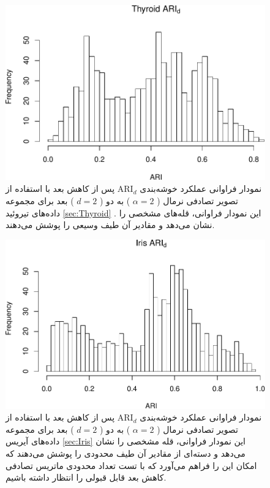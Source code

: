 \begin{figure}[H]
\centering
\includegraphics[width=0.7\linewidth]{Report_files/figure-latex/unnamed-chunk-3-1} 
\caption{
نمودار فراوانی عملکرد خوشه‌بندی 
$\mathrm{ARI}_d$
پس از کاهش بعد با استفاده از تصویر تصادفی
نرمال (%
$\alpha=2$%
)
به دو (%
$d=2$%
)
بعد برای مجموعه داده‌های
تیروئید
\ref{sec:Thyroid}
. این نمودار فراوانی،
قله‌های
مشخصی را نشان 
می‌دهد
و مقادیر آن طیف 
وسیعی را پوشش می‌دهند.
}
\end{figure}

\begin{figure}[H]
\centering
\includegraphics[width=0.7\linewidth]{Report_files/figure-latex/unnamed-chunk-3-2}
\caption{
نمودار فراوانی عملکرد خوشه‌بندی 
$\mathrm{ARI}_d$
پس از کاهش بعد با استفاده از تصویر تصادفی
نرمال (%
$\alpha=2$%
)
به دو (%
$d=2$%
)
بعد برای مجموعه داده‌های
آیریس
\ref{sec:Iris}
این نمودار فراوانی،
قله
مشخصی را نشان 
می‌دهد
و دسته‌ای از مقادیر آن طیف 
محدودی
را پوشش می‌دهند که امکان این را فراهم می‌آورد که با تست تعداد محدودی ماتریس تصادفی کاهش بعد قابل قبولی را انتظار داشته باشیم.
}
\end{figure}

